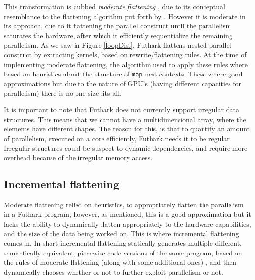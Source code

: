 This transformation is dubbed \textit{moderate flattening} \cite{futhark-nested-para}, due to its conceptual resemblance to the flattening algorithm put forth by \citeauthor{flat} \cite{flat}. However it is moderate in its approach, due to it flattening the parallel construct until the parallelism saturates the hardware, after which it efficiently sequentialize the remaining parallelism. As we saw in Figure \ref{loopDist}, Futhark flattens nested parallel construct by extracting kernels, based on rewrite/flattening rules. At the time of implementing moderate flattening, the algorithm used to apply these rules where based on heuristics about the structure of \texttt{map} nest contexts. These where good approximations but due to the nature of GPU's (having different capacities for parallelism) there is no one size fits all. 

It is important to note that Futhark does not currently support irregular data structures. This means that we cannot have a multidimensional array, where the elements have different shapes. The reason for this, is that to quantify an amount of parallelism, executed on a core efficiently, Futhark needs it to be regular. Irregular structures could be suspect to dynamic dependencies, and require more overhead because of the irregular memory access.  

\subsection{Incremental flattening}
Moderate flattening relied on heuristics, to appropriately flatten the parallelism in a Futhark program, however, as mentioned, this is a good approximation but it lacks the ability to dynamically flatten appropriately to the hardware capabilities, and the size of the data being worked on. This is where incremental flattening comes in. In short incremental flattening statically generates multiple different, semantically equivalent, piecewise code versions of the same program, based on the rules of moderate flattening (along with some additional ones) \cite{inc-flat}, and then dynamically chooses whether or not to further exploit parallelism or not.  


